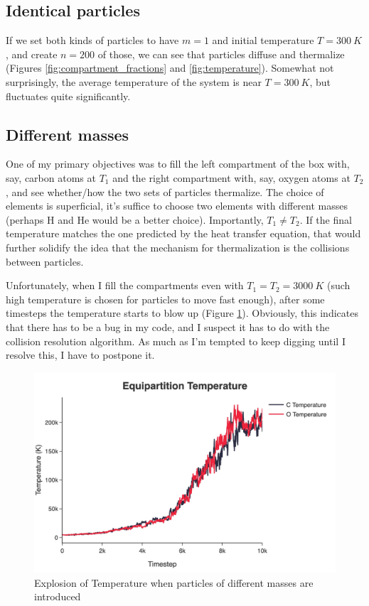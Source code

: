 \documentclass[12pt]{article}
\begin{document}
\subsection{Identical particles}
If we set both kinds of particles to have $m=1$ and initial temperature
$T=\qty{300}{K}$, and create $n=200$ of those, we can see that particles diffuse and thermalize (Figures \ref{fig:compartment_fractions} and \ref{fig:temperature}). Somewhat not surprisingly, the average temperature of the system is near $T=\qty{300}{K}$, but fluctuates quite significantly.


\subsection{Different masses}
One of my primary objectives was to fill the left compartment of the box with, say, carbon atoms at $T_1$ and the right compartment with, say, oxygen atoms at $T_2$, and see whether/how the two sets of particles thermalize. The choice of elements is superficial, it's suffice to choose two elements with different masses (perhaps H and He would be a better choice). Importantly, $T_1\neq T_2$. If the final temperature matches the one predicted by the heat transfer equation, that would further solidify the idea that the mechanism for thermalization is the collisions between particles.

Unfortunately, when I fill the compartments even with $T_1=T_2=\qty{3000}{K}$ (such high temperature is chosen for particles to move fast enough), after some timesteps the temperature starts to blow up (Figure \ref{fig:temperature-explosion}). Obviously, this indicates that there has to be a bug in my code, and I suspect it has to do with the collision resolution algorithm. As much as I'm tempted to keep digging until I resolve this, I have to postpone it.

\begin{figure}[h]
    \centering
    \includegraphics[width=0.8\linewidth]{../figures/jpg/equipartition_temperature_explosion.jpg}
    \caption{Explosion of Temperature when particles of different masses are introduced}
    \label{fig:temperature-explosion}
\end{figure}
\end{document}
